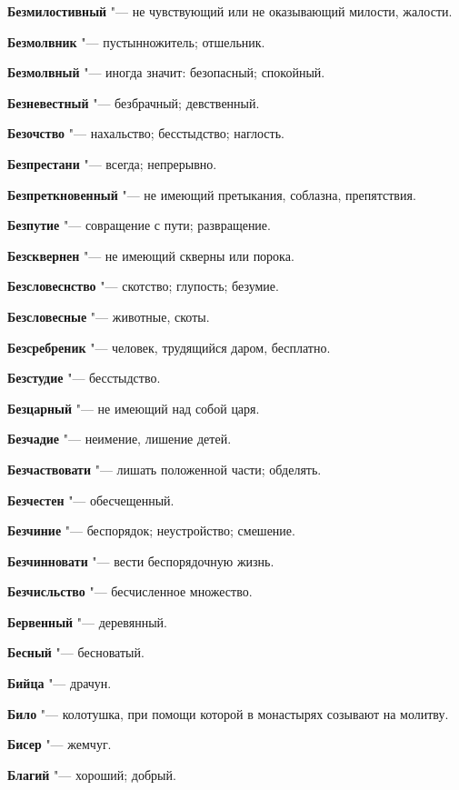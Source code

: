 \begin{mymulticols}
\noindent\textbf{Безмилостивный} "--- не чувствующий или не оказывающий милости, жалости. 

\noindent\textbf{Безмолвник} "--- пустынножитель; отшельник. 

\noindent\textbf{Безмолвный} "--- иногда значит: безопасный; спокойный. 

\noindent\textbf{Безневестный} "--- безбрачный; девственный. 

\noindent\textbf{Безочство} "--- нахальство; бесстыдство; наглость. 

\noindent\textbf{Безпрестани} "--- всегда; непрерывно. 

\noindent\textbf{Безпреткновенный} "--- не имеющий претыкания, соблазна, препятствия. 

\noindent\textbf{Безпутие} "--- совращение с пути; развращение. 

\noindent\textbf{Безсквернен} "--- не имеющий скверны или порока. 

\noindent\textbf{Безсловеснство} "--- скотство; глупость; безумие. 

\noindent\textbf{Безсловесные} "--- животные, скоты. 

\noindent\textbf{Безсребреник} "--- человек, трудящийся даром, бесплатно. 

\noindent\textbf{Безстудие} "--- бесстыдство. 

\noindent\textbf{Безцарный} "--- не имеющий над собой царя. 

\noindent\textbf{Безчадие} "--- неимение, лишение детей. 

\noindent\textbf{Безчаствовати} "--- лишать положенной части; обделять. 

\noindent\textbf{Безчестен} "--- обесчещенный. 

\noindent\textbf{Безчиние} "--- беспорядок; неустройство; смешение. 

\noindent\textbf{Безчинновати} "--- вести беспорядочную жизнь. 

\noindent\textbf{Безчисльство} "--- бесчисленное множество. 

\noindent\textbf{Бервенный} "--- деревянный. 

\noindent\textbf{Бесный} "--- бесноватый. 

\noindent\textbf{Бийца} "--- драчун. 

\noindent\textbf{Било} "--- колотушка, при помощи которой в монастырях созывают на молитву. 

\noindent\textbf{Бисер} "--- жемчуг. 

\noindent\textbf{Благий} "--- хороший; добрый. 


\end{mymulticols}
